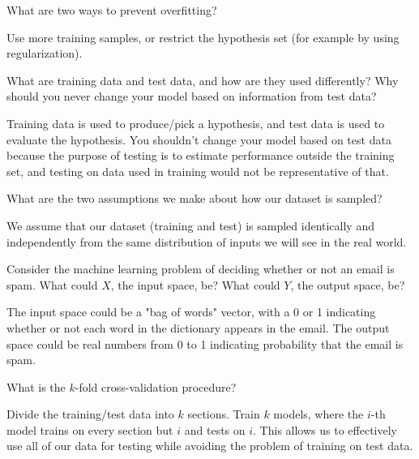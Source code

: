 \begin{problem}[2]
  What are two ways to prevent overfitting?
\end{problem}
\begin{solution}
  Use more training samples, or restrict the hypothesis set (for example by using regularization).
\end{solution}

\begin{problem}[2]
  What are training data and test data, and how are they used differently? Why should you never change your model based on information from test data?
\end{problem}
\begin{solution}
  Training data is used to produce/pick a hypothesis, and test data is used to evaluate the hypothesis.
  You shouldn't change your model based on test data because the purpose of testing is to estimate performance outside the training set, and testing on data used in training would not be representative of that.
\end{solution}

\begin{problem}[2]
  What are the two assumptions we make about how our dataset is sampled?
\end{problem}
\begin{solution}
  We assume that our dataset (training and test) is sampled identically and independently from the same distribution of inputs we will see in the real world.
\end{solution}

\begin{problem}[2]
  Consider the machine learning problem of deciding whether or not an email is spam. What could $X$, the input space, be? What could $Y$, the output space, be?
\end{problem}
\begin{solution}
  The input space could be a "bag of words" vector, with a 0 or 1 indicating whether or not each word in the dictionary appears in the email.
  The output space could be real numbers from 0 to 1 indicating probability that the email is spam.
\end{solution}

\begin{problem}[2]
  What is the $k$-fold cross-validation procedure?
\end{problem}
\begin{solution}
  Divide the training/test data into $k$ sections.
  Train $k$ models, where the $i$-th model trains on every section but $i$ and tests on $i$.
  This allows us to effectively use all of our data for testing while avoiding the problem of training on test data.
\end{solution}



